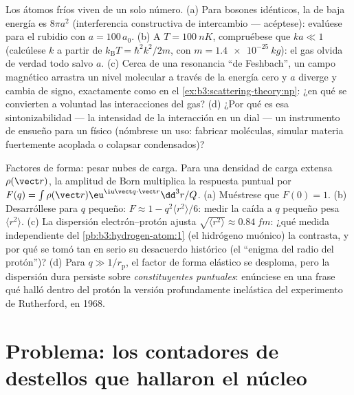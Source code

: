 \begin{exercise}[$\star\star\star$]\label{exo:b3:scattering-theory:11}
Los átomos fríos viven de un solo número. (a) Para bosones idénticos, la
 de baja energía es $8\pi a^2$ (interferencia constructiva de
intercambio --- acéptese): evalúese para el rubidio con $a =
100\,a_0$. (b) A $T = \qty{100}{nK}$, compruébese que $ka \ll 1$
(calcúlese $k$ a partir de $k_{\text{B}}T = \hbar^2k^2/2m$, con $m =
\qty{1.4e-25}{kg}$): el gas olvida de verdad todo salvo $a$.
(c) Cerca de una resonancia ``de Feshbach'', un campo magnético arrastra un
nivel molecular a través de la energía cero y $a$ diverge y cambia de
signo, exactamente como en el \cref{ex:b3:scattering-theory:np}: ¿en qué se
convierten a voluntad las interacciones del gas? (d) ¿Por qué es esa
sintonizabilidad --- la intensidad de la interacción en un dial --- un
instrumento de ensueño para un físico (nómbrese un uso: fabricar moléculas,
simular materia fuertemente acoplada o colapsar condensados)?
\end{exercise}

\begin{exercise}[$\star\star\star$]\label{exo:b3:scattering-theory:12}
Factores de forma: pesar nubes de carga. Para una densidad de carga
extensa $\rho(\vect r)$, la amplitud de Born multiplica la respuesta puntual
por $F(q) = \int\rho(\vect r)\eu^{\iu\vect q\cdot\vect r}
\dd^3r/Q$. (a) Muéstrese que $F(0) = 1$. (b) Desarróllese para $q$ pequeño: $F
\approx 1 - q^2\langle r^2\rangle/6$: medir la caída a $q$ pequeño pesa
$\langle r^2\rangle$. (c) La dispersión electrón--protón ajusta
$\sqrt{\langle r^2\rangle} \approx \qty{0.84}{fm}$: ¿qué medida
independiente del \cref{pb:b3:hydrogen-atom:1} (el hidrógeno muónico) la
contrasta, y por qué se tomó tan en serio su desacuerdo histórico (el
``enigma del radio del protón'')? (d) Para $q \gg 1/r_{\text{p}}$, el
factor de forma elástico se desploma, pero la dispersión dura persiste sobre
\emph{constituyentes puntuales}: enúnciese en una frase qué halló dentro del
protón la versión profundamente inelástica del experimento de Rutherford, en
1968.
\end{exercise}

\section{Problema: los contadores de destellos que hallaron el núcleo}

